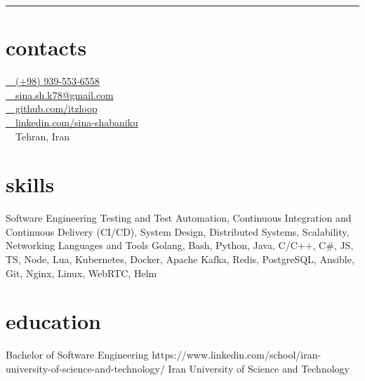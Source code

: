 \documentclass[a4paper,20pt]{article}
\begin{document}
\begin{center}
\end{center}
\vspace*{1pt}
\begin{center}
\end{center}
\rule{\textwidth}{1pt}
\vspace{40pt}
\begin{minipage}[t]{0.3\textwidth}
  \preparetopsec
  \section{contacts}
  {
    \href{tel:+989395536558}{ \small~~(+98) 939-553-6558} \\ \vspace{6pt}  
    \href{mailto:sina.sh.k78@gmail.com}{ \small~~sina.sh.k78@gmail.com} \\ \vspace{6pt} 
    \href{https://github.com/itzloop}{ \small~~github.com/itzloop}\\ \vspace{6pt} 
    \href{https://linkedin.com/in/sina-shabaniku}{ \small~~linkedin.com/sina-shabaniku} \\ \vspace{6pt} 
     \small~~Tehran, Iran
    \vspace*{14pt}
  }

  \preparenormalsec
  \section{skills}
  {
    \skill
      {Software Engineering}
      {Testing and Test Automation, Continuous Integration and Continuous Delivery (CI/CD), System Design, Distributed Systems, Scalability, Networking}
    \vspace*{6pt}
    \skill
      {Languages and Tools}
      {Golang, Bash, Python, Java, C/C++, C\#, JS, TS, Node, Lua, Kubernetes, Docker, Apache Kafka, Redis, PostgreSQL, Ansible, Git, Nginx, Linux, WebRTC, Helm}
  }
  \preparenormalsec
  \section{education}
  {
    \edu
      {Bachelor of Software Engineering}
      {https://www.linkedin.com/school/iran-university-of-science-and-technology/}
      {Iran University of Science and Technology}
      {}
  }
  \preparenormalsec

\end{minipage}
\end{document}
